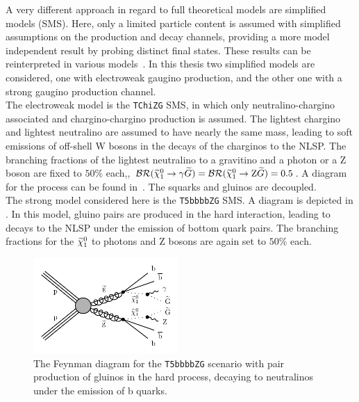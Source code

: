 A very different approach in regard to full theoretical models are simplified models (SMS)\cite{SMS}. Here, only a limited particle content is assumed with simplified assumptions on the production and decay channels, providing a more model independent result by probing distinct final states. These results can be reinterpreted in various models~\cite{SMSReInt}. In this thesis two simplified models are considered, one with electroweak gaugino production, and the other one with a strong gaugino production channel.\\
The electroweak model is the \texttt{TChiZG} SMS, in which only neutralino-chargino associated and chargino-chargino production is assumed. The lightest chargino and lightest neutralino are assumed to have nearly the same mass, leading to soft emissions of off-shell W bosons in the decays of the charginos to the NLSP. The branching fractions of the lightest neutralino to a gravitino and a photon or a Z boson are fixed to $50\%$ each,\ie, $\mathcal{BR}(\widetilde{\chi}^{0}_{1}\to\gamma\widetilde{G})=\mathcal{BR}(\widetilde{\chi}^{0}_{1}\to\mathrm{Z}\widetilde{G})=0.5$. A diagram for the process can be found in~. The squarks and gluinos are decoupled.\\
The strong model considered here is the \texttt{T5bbbbZG} SMS. A diagram is depicted in . In this model, gluino pairs are produced in the hard interaction, leading to decays to the NLSP under the emission of bottom quark pairs. The branching fractions for the $\widetilde{\chi}^{0}_{1}$ to photons and Z bosons are again set to $50\%$ each.

\begin{figure}[tbp]
 \centering
 \includegraphics[width=0.49\textwidth]{figures/signal/T5bbbbZG-crop}
 \caption{The Feynman diagram for the \texttt{T5bbbbZG} scenario with pair production of gluinos in the hard process, decaying to neutralinos under the emission of b quarks.}
 \label{fig:strongSMS}
\end{figure}


